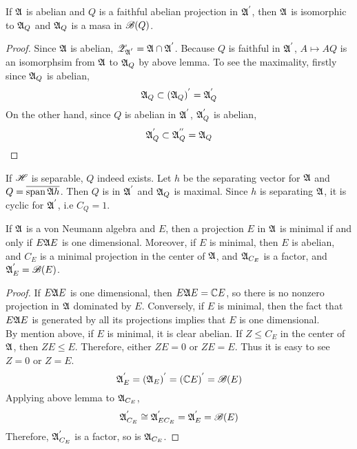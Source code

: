 \begin{prop}
	If $\mathfrak{A}$ is abelian and $Q$ is a faithful abelian projection in $\mathfrak{A}^{'}$, then $\mathfrak{A}$ is isomorphic to $\mathfrak{A}_Q$ and $\mathfrak{A}_Q$ is a masa in $\mathscr{B}(Q)$.
\end{prop}
\begin{proof}
	Since $\mathfrak{A}$ is abelian, $\mathscr{Z}_{\mathfrak{A}^{'}} = \mathfrak{A} \cap \mathfrak{A}^{'}$. Because $Q$ is faithful in $\mathfrak{A}^{'}$, $A \mapsto AQ$ is an isomorphsim from $\mathfrak{A}$ to $\mathfrak{A}_Q$ by above lemma. To see the maximality, firstly since $\mathfrak{A}_Q$ is abelian,
	\begin{equation*}
		\mathfrak{A}_Q \subset (\mathfrak{A}_Q)^{'} = \mathfrak{A}^{'}_Q
	\end{equation*}
	On the other hand, since $Q$ is abelian in $\mathfrak{A}^{'}$, $\mathfrak{A}^{'}_Q$ is abelian,
	\begin{equation*}
		\mathfrak{A}^{'}_Q \subset \mathfrak{A}^{''}_Q = \mathfrak{A}_Q \qedhere
	\end{equation*}
\end{proof}
\begin{rem}
	If $\mathscr{H}$ is separable, $Q$ indeed exists. Let $h$ be the separating vector for $\mathfrak{A}$ and $Q = \overline{\operatorname{span}{\mathfrak{A} h}}$. Then $Q$ is in $\mathfrak{A}^{'}$ and $\mathfrak{A}_Q$ is maximal. Since $h$ is separating $\mathfrak{A}$, it is cyclic for $\mathfrak{A}^{'}$, i.e $C_Q = 1$.
\end{rem}

\begin{prop}
	If $\mathfrak{A}$ is a von Neumann algebra and $E$, then a projection $E$ in $\mathfrak{A}$ is minimal if and only if $E \mathfrak{A} E$ is one dimensional. Moreover, if $E$ is minimal, then $E$ is abelian, and $C_E$ is a minimal projection in the center of $\mathfrak{A}$, and $\mathfrak{A}_{C_E}$ is a factor, and $\mathfrak{A}^{'}_E = \mathscr{B}(E)$.
\end{prop}
\begin{proof}
	If $E \mathfrak{A} E$ is one dimensional, then $E\mathfrak{A} E = \mathbb{C} E$, so there is no nonzero projection in $\mathfrak{A}$ dominated by $E$. Conversely, if $E$ is minimal, then the fact that $E\mathfrak{A} E$ is generated by all its projections implies that $E$ is one dimensional.\\
	By mention above, if $E$ is minimal, it is clear abelian. If $Z \leqslant C_E$ in the center of $\mathfrak{A}$, then $ZE \leqslant E$. Therefore, either $ZE = 0$ or $ZE = E$. Thus it is easy to see $Z = 0$ or $Z = E$. 
	\begin{equation*}
		\mathfrak{A}^{'}_E = (\mathfrak{A}_E)^{'} = (\mathbb{C} E)^{'} = \mathscr{B}(E)
	\end{equation*}
	Applying above lemma to $\mathfrak{A}_{C_E}$, 
	\begin{equation*}
		\mathfrak{A}^{'}_{C_E} \cong \mathfrak{A}^{'}_{EC_E} = \mathfrak{A}^{'}_{E} = \mathscr{B}(E)
	\end{equation*}
	Therefore, $\mathfrak{A}^{'}_{C_E}$ is a factor, so is $\mathfrak{A}_{C_E}$.
\end{proof}

